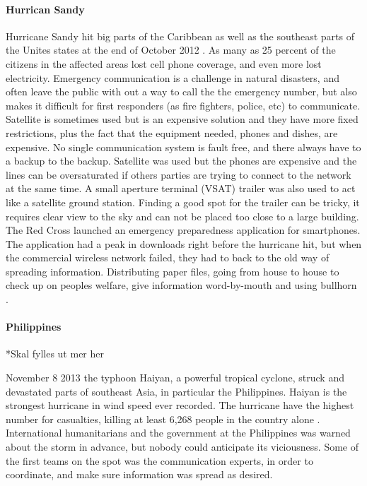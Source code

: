 \paragraph{Hurrican Sandy}
Hurricane Sandy hit big parts of the Caribbean as well as the southeast parts of the Unites states at the end of October 2012 \cite{WikiSandy}. As many as 25 percent of the citizens in the affected areas lost cell phone coverage, and even more lost electricity. Emergency communication is a challenge in natural disasters, and often leave the public with out a way to call the the emergency number, but also makes it difficult for first responders (as fire fighters, police, etc) to communicate.  Satellite is sometimes used but is an expensive solution and they have more fixed restrictions, plus the fact that the equipment needed, phones and dishes, are expensive. No single communication system is fault free, and there always have to a backup to the backup. Satellite was used but the phones are expensive and the lines can be oversaturated if others parties are trying to connect to the network at the same time. A small aperture terminal (VSAT) trailer was also used to act like a satellite ground station. Finding a good spot for the trailer can be tricky, it requires clear view to the sky and can not be placed too close to a large building. The Red Cross launched an emergency preparedness application for smartphones. The application had a peak in downloads right before the hurricane hit, but when the commercial wireless network failed, they had to back to the old way of spreading information. Distributing paper files, going from house to house to check up on peoples welfare, give information word-by-mouth and using bullhorn \cite{hurricaneSandy}.

\paragraph{Philippines}

*Skal fylles ut mer her

November 8 2013 the typhoon Haiyan, a powerful tropical cyclone, struck and devastated parts of southeast Asia, in particular the Philippines. Haiyan is the strongest hurricane in wind speed ever recorded. The hurricane have the highest number for casualties, killing at least 6,268 people in the country alone \cite{wikiHaiyan}. International humanitarians and the government at the Philippines was warned about the storm in advance, but nobody could anticipate its viciousness. Some of the first teams on the spot was the communication experts, in order to coordinate, and make sure information was spread as desired.    \cite{disasterResponse} 

